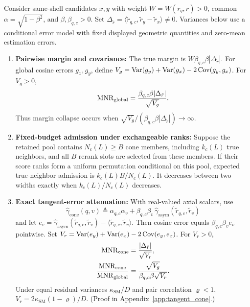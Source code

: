 \begin{theorem}
\label{thm:tangent_cone}
Consider same-shell candidates $x,y$ with weight $W=W(r_q,r)>0$, common $\alpha=\sqrt{1-\beta^2}$, and $\beta,\beta_{q,c}>0$. Set $\Delta_{\tilde r}=\langle\tilde r_{q,c},\tilde r_y-\tilde r_x\rangle\ne0$. Variances below use a conditional error model with fixed displayed geometric quantities and zero-mean estimation errors.
\begin{enumerate}
  \item \textbf{Pairwise margin and covariance:}
  The true margin is $W\beta_{q,c}\beta|\Delta_{\tilde r}|$. For global cosine errors $g_x,g_y$, define $V_g=\operatorname{Var}(g_y)+\operatorname{Var}(g_x)-2\operatorname{Cov}(g_y,g_x)$. For $V_g>0$,
  \begin{equation}
    \mathrm{MNR}_{\mathrm{global}}=\frac{\beta_{q,c}\beta|\Delta_{\tilde r}|}{\sqrt{V_g}}.
    \label{eq:mnr_collapse}
  \end{equation}
  Thus margin collapse occurs when $\sqrt{V_g}/(\beta_{q,c}\beta|\Delta_{\tilde r}|)\to\infty$.

  \item \textbf{Fixed-budget admission under exchangeable ranks:}
  Suppose the retained pool contains $N_c(L)\ge B$ cone members, including $k_c(L)$ true neighbors, and all $B$ rerank slots are selected from these members. If their score ranks form a uniform permutation conditional on this pool, expected true-neighbor admission is $k_c(L)B/N_c(L)$. It decreases between two widths exactly when $k_c(L)/N_c(L)$ decreases.

  \item \textbf{Exact tangent-error attenuation:}
  With real-valued axial scalars, use
  \begin{equation}
    \hat{\gamma}_{\mathrm{cone}}(q, v) \triangleq \alpha_{q,c}\alpha_v + \beta_{q,c}\beta_v\,\hat{\gamma}_{\mathrm{asym}}(\tilde{r}_{q,c}, \tilde{r}_v)
    \label{eq:cone_estimator}
  \end{equation}
  and let $e_v=\hat\gamma_{\mathrm{asym}}(\tilde r_{q,c},\tilde r_v)-\langle\tilde r_{q,c},\tilde r_v\rangle$. Then cosine error equals $\beta_{q,c}\beta_v e_v$ pointwise. Set $V_r=\operatorname{Var}(e_y)+\operatorname{Var}(e_x)-2\operatorname{Cov}(e_y,e_x)$. For $V_r>0$,
  \begin{equation}
    \begin{aligned}
      \mathrm{MNR}_{\mathrm{cone}}&=\frac{|\Delta_{\tilde r}|}{\sqrt{V_r}},\\
      \frac{\mathrm{MNR}_{\mathrm{cone}}}{\mathrm{MNR}_{\mathrm{global}}}
      &=\frac{\sqrt{V_g}}{\beta_{q,c}\beta\sqrt{V_r}}.
    \end{aligned}
    \label{eq:mnr_recovery}
  \end{equation}
  Under equal residual variances $\kappa_{\mathrm{SM}}/D$ and pair correlation $\varrho<1$, $V_r=2\kappa_{\mathrm{SM}}(1-\varrho)/D$.
  \ifpreprint(Proof in Appendix~\ref{app:tangent_cone}.)\fi
\end{enumerate}
\end{theorem}

